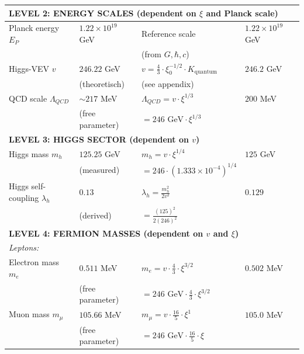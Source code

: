 \begin{longtable}{p{4.0cm}p{3.2cm}p{2.8cm}p{2.8cm}}
	\midrule
	\multicolumn{4}{l}{\textbf{LEVEL 2: ENERGY SCALES (dependent on $\xi$ and Planck scale)}} \\
	\midrule
	
	Planck energy $E_P$ & $1.22 \times 10^{19}$ GeV & Reference scale & $1.22 \times 10^{19}$ GeV \\
	& & (from $G, \hbar, c$) & \\[0.3em]
	
Higgs-VEV $v$ & $246.22$ GeV & $v = \frac{4}{3} \cdot \xi_0^{-1/2} \cdot K_{\text{quantum}}$ & $246.2$ GeV \\
& (theoretisch) & (see appendix) & \\[0.3em]
	
	QCD scale $\Lambda_{QCD}$ & $\sim 217$ MeV & $\Lambda_{QCD} = v \cdot \xi^{1/3}$ & $200$ MeV \\
	& (free parameter) & $= 246 \text{ GeV} \cdot \xi^{1/3}$ & \\[0.3em]
	
	\midrule
	\multicolumn{4}{l}{\textbf{LEVEL 3: HIGGS SECTOR (dependent on $v$)}} \\
	\midrule
	
	Higgs mass $m_h$ & $125.25$ GeV & $m_h = v \cdot \xi^{1/4}$ & $125$ GeV \\
	& (measured) & $= 246 \cdot (1.333 \times 10^{-4})^{1/4}$ & \\[0.3em]
	
	Higgs self-coupling $\lambda_h$ & $0.13$ & $\lambda_h = \frac{m_h^2}{2v^2}$ & $0.129$ \\
	& (derived) & $= \frac{(125)^2}{2(246)^2}$ & \\[0.3em]
	
	\midrule
	\multicolumn{4}{l}{\textbf{LEVEL 4: FERMION MASSES (dependent on $v$ and $\xi$)}} \\
	\midrule
	
	\multicolumn{4}{l}{\textit{Leptons:}} \\
	
	Electron mass $m_e$ & $0.511$ MeV & $m_e = v \cdot \frac{4}{3} \cdot \xi^{3/2}$ & $0.502$ MeV \\
	& (free parameter) & $= 246 \text{ GeV} \cdot \frac{4}{3} \cdot \xi^{3/2}$ & \\[0.3em]
	
	Muon mass $m_\mu$ & $105.66$ MeV & $m_\mu = v \cdot \frac{16}{5} \cdot \xi^1$ & $105.0$ MeV \\
	& (free parameter) & $= 246 \text{ GeV} \cdot \frac{16}{5} \cdot \xi$ & \\[0.3em]
	

\end{longtable}
